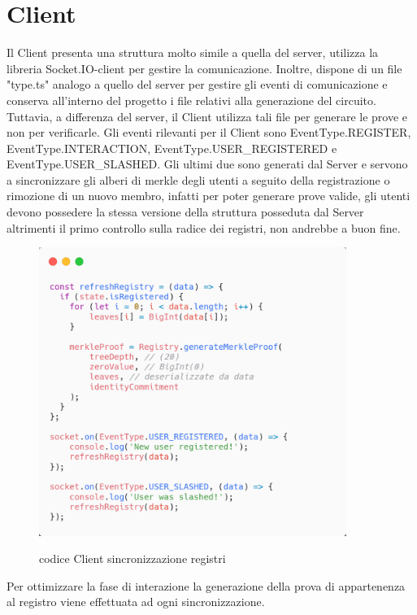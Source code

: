 \section{Client}
Il Client presenta una struttura molto simile a quella del server, utilizza la libreria Socket.IO-client per gestire la comunicazione. Inoltre, dispone di un file "type.ts" analogo a quello del server per gestire gli eventi di comunicazione e conserva all'interno del progetto i file relativi alla generazione del circuito. Tuttavia, a differenza del server, il Client utilizza tali file per generare le prove e non per verificarle. Gli eventi rilevanti per il Client sono EventType.REGISTER, EventType.INTERACTION, EventType.USER\_REGISTERED e EventType.USER\_SLASHED. Gli ultimi due sono generati dal Server e servono a sincronizzare gli alberi di merkle degli utenti a seguito della registrazione o rimozione di un nuovo membro, infatti per poter generare prove valide, gli utenti devono possedere la stessa versione della struttura posseduta dal Server altrimenti il primo controllo sulla radice dei registri, non andrebbe a buon fine. \clearpage
\begin{figure}[H]
    \centering
    \includegraphics[width=10cm]{./chapters/3.poc/images/4.1.client.png}
    \label{fig:1.client}
    \captionsetup{justification=centering}
    \caption{codice Client sincronizzazione registri}
\end{figure}
Per ottimizzare la fase di interazione la generazione della prova di appartenenza al registro viene effettuata ad ogni sincronizzazione.
